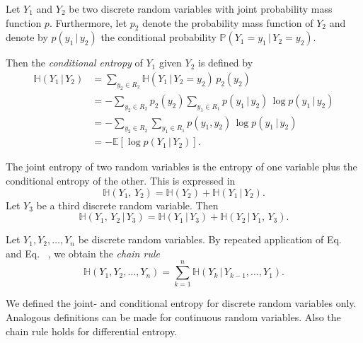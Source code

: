 \documentclass[smallextended]{svjour3}
\makeatletter
\renewcommand*{\eqref}[1]{%
  \hyperref[{#1}]{\textup{\tagform@{\ref*{#1}}}}%
}
\renewcommand{\P}{\mathbb{P}}
\newcommand{\E}{\mathbb{E}}
\renewcommand{\H}{\mathbb{H}}
\newcommand{\suml}{\sum\limits}
\makeatother
\begin{document}
\begin{definition}%
\label{def:conditional_entropy}
	Let $Y_1$ and $Y_2$ be two discrete random variables with joint probability mass function $p$.
	Furthermore, let $p_2$ denote the probability mass function of $Y_2$ and denote by $p(y_1\,|\,y_2)$ the conditional probability $\P(Y_1=y_1\,|\,Y_2=y_2)$.
	
	Then the \emph{conditional entropy} of $Y_1$ given $Y_2$ is defined by
	\begin{equation*}
		\begin{aligned}
			\H(Y_1\,|\,Y_2) &= \suml_{y_2\in R_2} \H(Y_1\,|\,Y_2=y_2)\,p_2(y_2)\\
			&= -\suml_{y_2\in R_2} p_2(y_2)\suml_{y_1\in R_1}p(y_1\,|\,y_2)\,\log p(y_1\,|\,y_2)\\
			&= -\suml_{y_2\in R_2}\suml_{y_1\in R_1} p(y_1,y_2)\,\log p(y_1\,|\,y_2)\\
			&= -\E\left[\log p(Y_1\,|\,Y_2)\right].
		\end{aligned}
	\end{equation*}
\end{definition}

The joint entropy of two random variables is the entropy of one variable plus the conditional entropy of the other.
This is expressed in 
\begin{equation}\label{eqn:two_expansion_rule}
	\H(Y_1,\,Y_2) = \H(Y_2) + \H(Y_1\,|\,Y_2).
\end{equation}
Let $Y_3$ be a third discrete random variable.
Then
\begin{equation}\label{eqn:three_expansion_rule}
	\H(Y_1,\,Y_2\,|\,Y_3) = \H(Y_1\,|\,Y_3) + \H(Y_2\,|\,Y_1,\,Y_3).
\end{equation}

Let $Y_1,Y_2,\ldots,Y_n$ be discrete random variables.
By repeated application of Eq.~\eqref{eqn:two_expansion_rule} and Eq.~\eqref{eqn:three_expansion_rule}, we obtain the \emph{chain rule}
\begin{equation}\label{eqn:chain_rule}
	\H(Y_1,Y_2,\ldots,Y_n) = \suml_{k=1}^n \H(Y_k\,|\,Y_{k-1},\ldots,Y_1).
\end{equation}

\begin{remark}
	We defined the joint- and conditional entropy for discrete random variables only.
	Analogous definitions can be made for continuous random variables.
	Also the chain rule holds for differential entropy.
\end{remark}
\end{document}
